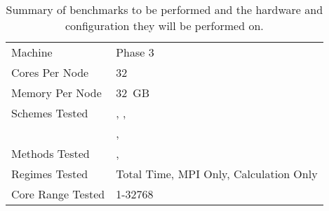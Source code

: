 \begin{table}
    \begin{tabular}{|l|l|}
        \hline
        Machine & \hector{} Phase 3 \\
        Cores Per Node & 32 \\
        Memory Per Node & 32~GB \\
        \hline
        Schemes Tested & \replicateddata{}, \systolicloop{}, \\
                       & \sharedandreplicateddata{},
                         \replicatedsystolicloop{} \\
        Methods Tested & \individualoperation{}, \pairoperation{} \\
        Regimes Tested & Total Time, MPI Only, Calculation Only \\
        Core Range Tested & 1-32768 \\
        \hline
    \end{tabular}
    \caption{
        Summary of benchmarks to be performed and the hardware and
        configuration they will be performed on.
    }
    \label{table:benchmark_configuration}
\end{table}

